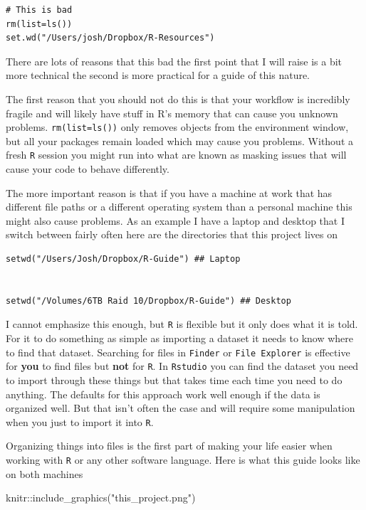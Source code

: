 \documentclass[]{tufte-handout}
\newenvironment{Shaded}{}{}
\newcommand{\FunctionTok}[1]{\textcolor[rgb]{0.02,0.16,0.49}{#1}}
\newcommand{\NormalTok}[1]{#1}
\newcommand{\SpecialCharTok}[1]{\textcolor[rgb]{0.25,0.44,0.63}{#1}}
\newcommand{\StringTok}[1]{\textcolor[rgb]{0.25,0.44,0.63}{#1}}
\begin{document}
\begin{verbatim}
# This is bad
rm(list=ls())
set.wd("/Users/josh/Dropbox/R-Resources")

\end{verbatim}

There are lots of reasons that this bad the first point that I will
raise is a bit more technical the second is more practical for a guide
of this nature.

The first reason that you should not do this is that your workflow is
incredibly fragile and will likely have stuff in R's memory that can
cause you unknown problems. \texttt{rm(list=ls())} only removes objects
from the environment window, but all your packages remain loaded which
may cause you problems. Without a fresh \texttt{R} session you might run
into what are known as masking issues that will cause your code to
behave differently.

The more important reason is that if you have a machine at work that has
different file paths or a different operating system than a personal
machine this might also cause problems. As an example I have a laptop
and desktop that I switch between fairly often here are the directories
that this project lives on

\begin{verbatim}
setwd("/Users/Josh/Dropbox/R-Guide") ## Laptop


setwd("/Volumes/6TB Raid 10/Dropbox/R-Guide") ## Desktop
\end{verbatim}

I cannot emphasize this enough, but \texttt{R} is flexible but it only
does what it is told. For it to do something as simple as importing a
dataset it needs to know where to find that dataset. Searching for files
in \texttt{Finder} or \texttt{File\ Explorer} is effective for
\textbf{you} to find files but \textbf{not} for \texttt{R}. In
\texttt{Rstudio} you can find the dataset you need to import through
these things but that takes time each time you need to do anything. The
defaults for this approach work well enough if the data is organized
well. But that isn't often the case and will require some manipulation
when you just to import it into \texttt{R}.

Organizing things into files is the first part of making your life
easier when working with \texttt{R} or any other software language. Here
is what this guide looks like on both machines

\begin{Shaded}
\begin{Highlighting}[]
\NormalTok{knitr}\SpecialCharTok{::}\FunctionTok{include\_graphics}\NormalTok{(}\StringTok{"this\_project.png"}\NormalTok{)}
\end{Highlighting}
\end{Shaded}
\end{document}
